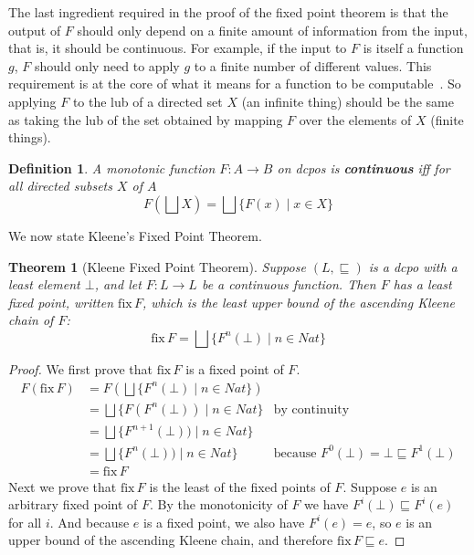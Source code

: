 \documentclass{tufte-handout}
\newcommand{\NAT}[0]{\ensuremath{\mathit{Nat}}}
\newtheorem{theorem}{Theorem}%
\newtheorem{definition}{Definition}%
\begin{document}
The last ingredient required in the proof of the fixed point theorem
is that the output of $F$ should only depend on a finite amount of
information from the input, that is, it should be continuous. For
example, if the input to $F$ is itself a function $g$, $F$ should only
need to apply $g$ to a finite number of different values.  This
requirement is at the core of what it means for a function to be
computable~\citep{Gunter:1990aa}.  So applying $F$ to the lub of a
directed set $X$ (an infinite thing) should be the same as taking the
lub of the set obtained by mapping $F$ over the elements of $X$
(finite things).

\begin{definition}
  A monotonic function $F : A {\to} B$ on dcpos is
  \textbf{\emph{continuous}} iff for all directed subsets $X$ of $A$
  \[
  F(\bigsqcup X) = \bigsqcup \{ F(x) \mid x \in X \}
  \]
\end{definition}

We now state Kleene's Fixed Point Theorem.

\begin{theorem}[Kleene Fixed Point Theorem]\label{thm:fixed-point}
Suppose $(L,\sqsubseteq)$ is a dcpo with a least element $\bot$, and
let $F:L\to L$ be a continuous function. Then $F$ has a least fixed
point, written $\mathrm{fix}\,F$, which is the least upper bound of
the ascending Kleene chain of $F$:
\[
  \mathrm{fix}\,F = \bigsqcup \{ F^n(\bot) \mid n \in \mathit{Nat} \}
\]
\end{theorem}
\begin{proof}
We first prove that $\mathrm{fix}\,F$ is a fixed point of $F$.
\begin{align*}
  F(\mathrm{fix}\,F) &= F(\bigsqcup \{ F^n(\bot) \mid n \in \NAT \})\\
  &= \bigsqcup\{ F(F^n(\bot)) \mid n \in \NAT \} & \text{by continuity}\\
  &= \bigsqcup\{ F^{n+1}(\bot)) \mid n \in \NAT \} \\
  &= \bigsqcup\{ F^n(\bot)) \mid n \in \NAT \} 
  & \text{because } F^0(\bot) = \bot \sqsubseteq F^1(\bot)  \\
  &= \mathrm{fix}\,F
\end{align*}
Next we prove that $\mathrm{fix}\,F$ is the least of the fixed points
of $F$. Suppose $e$ is an arbitrary fixed point of $F$. By the
monotonicity of $F$ we have $F^i(\bot) \sqsubseteq F^i(e)$ for all
$i$.  And because $e$ is a fixed point, we also have $F^i(e) = e$, so
$e$ is an upper bound of the ascending Kleene chain, and therefore
$\mathrm{fix}\,F \sqsubseteq e$.
\end{proof}
\end{document}
